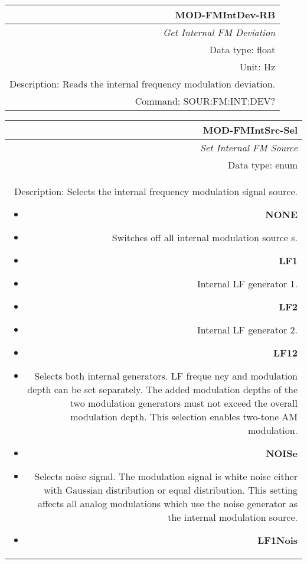 \documentclass[openany]{article}
\begin{document}
		\begin{tabular}{N}
			\hline
			\bfseries MOD-FMIntDev-RB \\ \hline
			\emph{Get Internal FM Deviation} \\
			Data type: float \\
			Unit: Hz \\
			Description: Reads the internal frequency modulation deviation. \\
			Command: SOUR:FM:INT:DEV? \\

		\end{tabular}
%
		\begin{tabular}{N}
			\hline
			\bfseries MOD-FMIntSrc-Sel \\ \hline
			\emph{Set Internal FM Source} \\
			Data type: enum \\  
			Description: Selects the internal frequency modulation signal source.\begin{itemize}[noitemsep]
				\small
				\item[] \textbf{NONE}
                                \item[] Switches off all internal modulation source     s.
                                \item[] \textbf{LF1}
                                \item[] Internal LF generator 1.
                                \item[] \textbf{LF2}
                                \item[] Internal LF generator 2.
                                \item[] \textbf{LF12}
                                \item[] Selects both internal generators. LF freque     ncy and modulation depth can be set separately. The added modulation depths of the two modulation generators must not exceed the overall modulation depth. This selection enables two-tone AM modulation.
                                \item[] \textbf{NOISe}
                                \item[] Selects noise signal. The modulation signal      is white noise either with Gaussian distribution or equal distribution. This setting affects all analog modulations which use the noise generator as the internal modulation source.
                                \item[] \textbf{LF1Nois}

\end{itemize}
\end{tabular}
\end{document}
